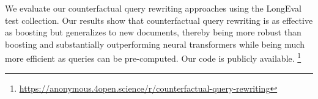 We evaluate our counterfactual query rewriting approaches using the LongEval test collection.%
Our results show that counterfactual query rewriting is as effective as boosting but generalizes to new documents, thereby being more robust than boosting and substantially outperforming neural transformers while being much more efficient as queries can be pre-computed. Our code is publicly available.%
\footnote{\url{https://anonymous.4open.science/r/counterfactual-query-rewriting}}



